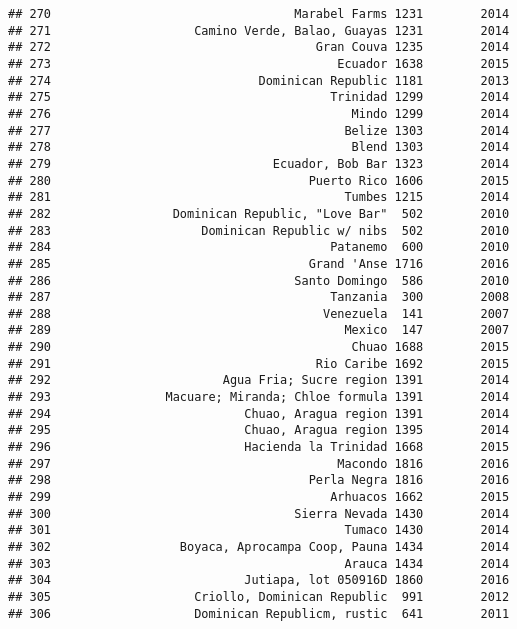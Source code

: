\documentclass[
]{article}
\begin{document}
\begin{verbatim}
## 270                                  Marabel Farms 1231        2014
## 271                    Camino Verde, Balao, Guayas 1231        2014
## 272                                     Gran Couva 1235        2014
## 273                                        Ecuador 1638        2015
## 274                             Dominican Republic 1181        2013
## 275                                       Trinidad 1299        2014
## 276                                          Mindo 1299        2014
## 277                                         Belize 1303        2014
## 278                                          Blend 1303        2014
## 279                               Ecuador, Bob Bar 1323        2014
## 280                                    Puerto Rico 1606        2015
## 281                                         Tumbes 1215        2014
## 282                 Dominican Republic, "Love Bar"  502        2010
## 283                     Dominican Republic w/ nibs  502        2010
## 284                                       Patanemo  600        2010
## 285                                    Grand 'Anse 1716        2016
## 286                                  Santo Domingo  586        2010
## 287                                       Tanzania  300        2008
## 288                                      Venezuela  141        2007
## 289                                         Mexico  147        2007
## 290                                          Chuao 1688        2015
## 291                                     Rio Caribe 1692        2015
## 292                        Agua Fria; Sucre region 1391        2014
## 293                Macuare; Miranda; Chloe formula 1391        2014
## 294                           Chuao, Aragua region 1391        2014
## 295                           Chuao, Aragua region 1395        2014
## 296                           Hacienda la Trinidad 1668        2015
## 297                                        Macondo 1816        2016
## 298                                    Perla Negra 1816        2016
## 299                                       Arhuacos 1662        2015
## 300                                  Sierra Nevada 1430        2014
## 301                                         Tumaco 1430        2014
## 302                  Boyaca, Aprocampa Coop, Pauna 1434        2014
## 303                                         Arauca 1434        2014
## 304                           Jutiapa, lot 050916D 1860        2016
## 305                    Criollo, Dominican Republic  991        2012
## 306                    Dominican Republicm, rustic  641        2011

\end{verbatim}
\end{document}
